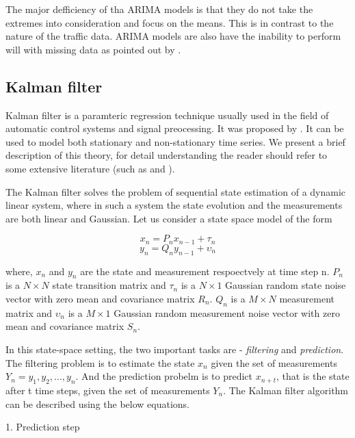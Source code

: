 The major defficiency of tha ARIMA models is that they do not take the extremes into
consideration and focus on the means. This is in contrast to the nature of the traffic data.
ARIMA models are also have the inability to perform will with missing data as pointed out by
\citet{smith1997traffic}.


\subsection{Kalman filter}
Kalman filter is a paramteric regression technique usually used in the field of automatic control
systems and signal preocessing. It was proposed by \citet{kalman1960new}. It can be used to model
both stationary and non-stationary time series. We present a brief description of this theory, for
detail understanding the reader should refer to some extensive literature (such as
\citet{harvey1990forecasting}  and \citet{haykin2001kalman}).


The Kalman filter solves the problem of sequential state estimation of a dynamic linear system, where
in such a system the state evolution and the measurements are both linear and Gaussian. Let us consider
a state space model of the form

        \begin{equation} x_{n} = P_{n}x_{n-1} + \tau_{n} \end{equation}
        \begin{equation} y_{n} = Q_{n}y_{n-1} + \upsilon_{n} \end{equation}

where, $x_{n}$ and $y_{n}$ are the state and measurement respoectvely at time step n.
$P_{n}$ is a $N \times N$ state transition matrix and $\tau_{n}$ is a $N \times 1$ Gaussian
random state noise vector with zero mean and covariance matrix $R_{n}$. $Q_{n}$ is a $M \times N$
measurement matrix and $\upsilon_{n}$ is a $M \times 1$ Gaussian random measurement noise vector
with zero mean and covariance matrix $S_{n}$.

In this state-space setting, the two important tasks are - \textit{filtering} and \textit{prediction}.
The filtering problem is to estimate the state $x_{n}$ given the set of measurements
$Y_{n} = y_{1}, y_{2},...,y_{n}$. And the prediction probelm is to predict $x_{n+t}$, that is the
state after t time steps, given the set of measurements $Y_{n}$. The Kalman filter algorithm can be
described using the below equations.

        1. Prediction step


